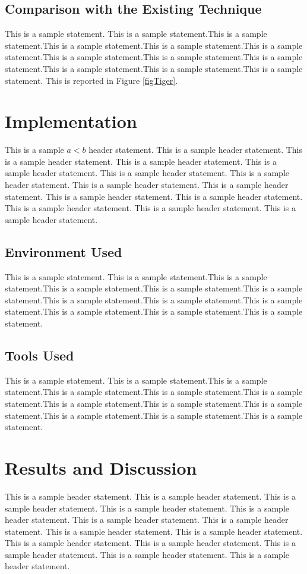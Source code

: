 \documentclass[12pt]{report}
\begin{document}
\section{Comparison with the Existing Technique}
This is a sample statement. This is a sample statement.This is a sample statement.This is a sample statement.This is a sample statement.This is a sample statement.This is a sample statement.This is a sample statement.This is a sample statement.This is a sample statement.This is a sample statement.This is a sample statement. This is reported in Figure \ref{figTiger}.


\chapter{Implementation}
This is a sample $a<b$ header statement. This is a sample header statement. This is a sample header statement. This is a sample header statement. This is a sample header statement. This is a sample header statement. This is a sample header statement. This is a sample header statement. This is a sample header statement. This is a sample header statement. This is a sample header statement. This is a sample header statement. This is a sample header statement. This is a sample header statement. 


\section{Environment Used}
This is a sample statement. This is a sample statement.This is a sample statement.This is a sample statement.This is a sample statement.This is a sample statement.This is a sample statement.This is a sample statement.This is a sample statement.This is a sample statement.This is a sample statement.This is a sample statement.

\section{Tools Used}
This is a sample statement. This is a sample statement.This is a sample statement.This is a sample statement.This is a sample statement.This is a sample statement.This is a sample statement.This is a sample statement.This is a sample statement.This is a sample statement.This is a sample statement.This is a sample statement.

\chapter{Results and Discussion}
This is a sample header statement. This is a sample header statement. This is a sample header statement. This is a sample header statement. This is a sample header statement. This is a sample header statement. This is a sample header statement. This is a sample header statement. This is a sample header statement. This is a sample header statement. This is a sample header statement. This is a sample header statement. This is a sample header statement. This is a sample header statement. 
\end{document}
